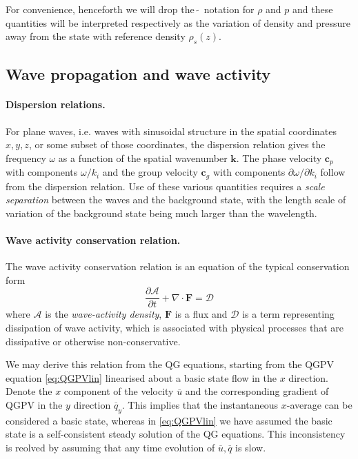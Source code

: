 \documentclass{jknotes}
\begin{document}
For convenience, henceforth we will drop the \,$\tilde{}$\, notation for $\rho$
and $p$ and these quantities will be interpreted respectively as the variation
of density and pressure away from the state with reference density
$\rho_s(z)$.

\subsection{Wave propagation and wave activity}
\paragraph{Dispersion relations.}
For plane waves, i.e. waves with sinusoidal structure in the spatial
coordinates $x, y, z$, or some subset of those coordinates, the dispersion
relation gives the frequency $\omega$ as a function of the spatial wavenumber
$\symbf{k}$. The phase velocity $\symbf{c}_p$ with components $\omega/k_i$ and
the group velocity $\symbf{c}_g$ with components $\partial \omega/\partial
k_i$ follow from the dispersion relation. Use of these various quantities
requires a \emph{scale separation} between the waves and the background
state, with the length scale of variation of the background state being much
larger than the wavelength.

\paragraph{Wave activity conservation relation.}
The wave activity conservation relation is an equation of the typical
conservation form
\begin{equation}
	\frac{\partial \mathcal{A}}{\partial t} + \nabla \cdot \symbf{F} =
	\mathcal{D}
\end{equation}
where $\mathcal{A}$ is the \emph{wave-activity density}, $\symbf{F}$ is a flux
and $\mathcal{D}$ is a term representing dissipation of wave activity, which
is associated with physical processes that are dissipative or otherwise
non-conservative.

We may derive this relation from the QG equations, starting from the QGPV
equation \eqref{eq:QGPVlin} linearised about a basic state flow in the $x$
direction. Denote the $x$ component of the velocity $\overline{u}$ and the
corresponding gradient of QGPV in the $y$ direction $\overline{q}_y$. This
implies that the instantaneous $x$-average can be considered a basic state,
whereas in \eqref{eq:QGPVlin} we have assumed the basic state is a
self-consistent steady solution of the QG equations. This inconsistency is
reolved by assuming that any time evolution of $\overline{u}, \overline{q}$ is
slow.
\end{document}

